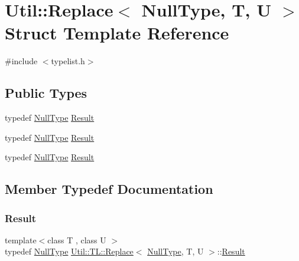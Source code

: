 \hypertarget{structUtil_1_1TL_1_1Replace_3_01NullType_00_01T_00_01U_01_4}{}\section{Util\+:\+:Replace$<$ Null\+Type, T, U $>$ Struct Template Reference}
\label{structUtil_1_1TL_1_1Replace_3_01NullType_00_01T_00_01U_01_4}


{\ttfamily \#include $<$typelist.\+h$>$}

\subsection*{Public Types}
\begin{DoxyCompactItemize}
\item 
typedef \mbox{\hyperlink{classUtil_1_1NullType}{Null\+Type}} \mbox{\hyperlink{structUtil_1_1TL_1_1Replace_3_01NullType_00_01T_00_01U_01_4_a28b43cf01f62dc72284927d673a7d228}{Result}}
\item 
typedef \mbox{\hyperlink{classUtil_1_1NullType}{Null\+Type}} \mbox{\hyperlink{structUtil_1_1TL_1_1Replace_3_01NullType_00_01T_00_01U_01_4_a28b43cf01f62dc72284927d673a7d228}{Result}}
\item 
typedef \mbox{\hyperlink{classUtil_1_1NullType}{Null\+Type}} \mbox{\hyperlink{structUtil_1_1TL_1_1Replace_3_01NullType_00_01T_00_01U_01_4_a28b43cf01f62dc72284927d673a7d228}{Result}}
\end{DoxyCompactItemize}


\subsection{Member Typedef Documentation}
\mbox{\label{structUtil_1_1TL_1_1Replace_3_01NullType_00_01T_00_01U_01_4_a28b43cf01f62dc72284927d673a7d228}} 
\subsubsection{\texorpdfstring{Result}{Result}\hspace{0.1cm}{\footnotesize\ttfamily [1/3]}}
{\footnotesize\ttfamily template$<$class T , class U $>$ \\
typedef \mbox{\hyperlink{classUtil_1_1NullType}{Null\+Type}} \mbox{\hyperlink{structUtil_1_1TL_1_1Replace}{Util\+::\+T\+L\+::\+Replace}}$<$ \mbox{\hyperlink{classUtil_1_1NullType}{Null\+Type}}, T, U $>$\+::\mbox{\hyperlink{structUtil_1_1TL_1_1Replace_3_01NullType_00_01T_00_01U_01_4_a28b43cf01f62dc72284927d673a7d228}{Result}}}

